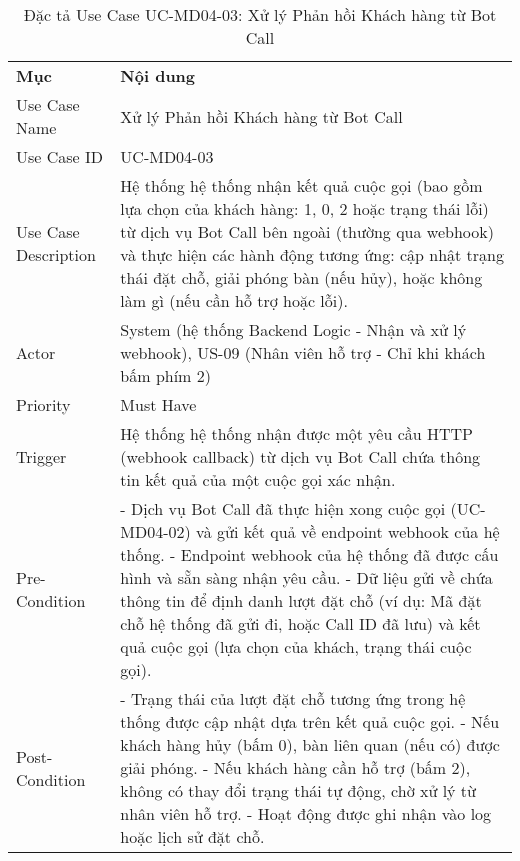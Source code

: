 \begin{longtable}{|m{4cm}|p{11cm}|}
\caption{Đặc tả Use Case UC-MD04-03: Xử lý Phản hồi Khách hàng từ Bot Call} \label{tab:uc_md04_03} \\
\hline

\endhead %
\hline
\endfoot %
\hline
\endlastfoot %
\multicolumn{2}{|c|}{\textbf{2.1. Tóm tắt (Summary)}} \\
\hline
\textbf{Mục} & \textbf{Nội dung} \\
\hline
Use Case Name & Xử lý Phản hồi Khách hàng từ Bot Call \\
\hline
Use Case ID & UC-MD04-03 \\
\hline
Use Case Description & Hệ thống hệ thống nhận kết quả cuộc gọi (bao gồm lựa chọn của khách hàng: 1, 0, 2 hoặc trạng thái lỗi) từ dịch vụ Bot Call bên ngoài (thường qua webhook) và thực hiện các hành động tương ứng: cập nhật trạng thái đặt chỗ, giải phóng bàn (nếu hủy), hoặc không làm gì (nếu cần hỗ trợ hoặc lỗi). \\
\hline
Actor & System (hệ thống Backend Logic - Nhận và xử lý webhook), US-09 (Nhân viên hỗ trợ - Chỉ khi khách bấm phím 2) \\
\hline
Priority & Must Have \\
\hline
Trigger & Hệ thống hệ thống nhận được một yêu cầu HTTP (webhook callback) từ dịch vụ Bot Call chứa thông tin kết quả của một cuộc gọi xác nhận. \\
\hline
Pre-Condition & - Dịch vụ Bot Call đã thực hiện xong cuộc gọi (UC-MD04-02) và gửi kết quả về endpoint webhook của hệ thống. \newline - Endpoint webhook của hệ thống đã được cấu hình và sẵn sàng nhận yêu cầu. \newline - Dữ liệu gửi về chứa thông tin để định danh lượt đặt chỗ (ví dụ: Mã đặt chỗ hệ thống đã gửi đi, hoặc Call ID đã lưu) và kết quả cuộc gọi (lựa chọn của khách, trạng thái cuộc gọi). \\
\hline
Post-Condition & - Trạng thái của lượt đặt chỗ tương ứng trong hệ thống được cập nhật dựa trên kết quả cuộc gọi. \newline - Nếu khách hàng hủy (bấm 0), bàn liên quan (nếu có) được giải phóng. \newline - Nếu khách hàng cần hỗ trợ (bấm 2), không có thay đổi trạng thái tự động, chờ xử lý từ nhân viên hỗ trợ. \newline - Hoạt động được ghi nhận vào log hoặc lịch sử đặt chỗ. \\

\end{longtable}
